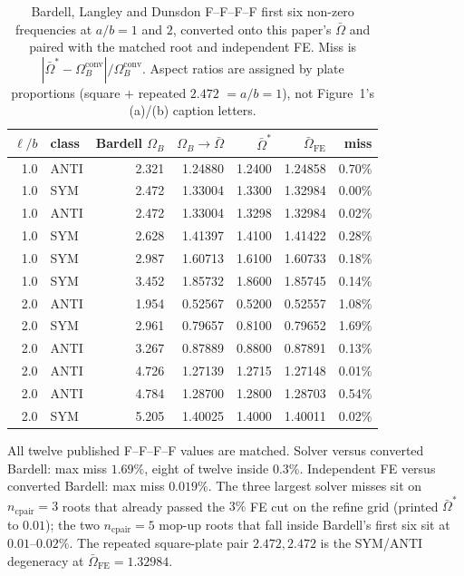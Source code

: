 \documentclass[11pt]{article}
\begin{document}
\begin{table}[!htbp]\centering\footnotesize
\caption{Bardell, Langley and Dunsdon \cite{bardell1996} F--F--F--F first
six non-zero frequencies at $a/b=1$ and $2$, converted onto this paper's
$\bar\Omega$ and paired with the matched root and independent FE.
Miss is $|\bar\Omega^{*}-\Omega_B^{\mathrm{conv}}|/\Omega_B^{\mathrm{conv}}$.
Aspect ratios are assigned by plate proportions (square $+$ repeated
$2.472$ $=a/b=1$), not Figure~1's (a)/(b) caption letters.}
\label{tab:bardell}
\setlength{\tabcolsep}{4pt}
\begin{tabular}{@{}rlrrrrr@{}}
\toprule
$\ell/b$ & class & Bardell $\Omega_B$ & $\Omega_B\to\bar\Omega$ & $\bar\Omega^{*}$ & $\bar\Omega_{\mathrm{FE}}$ & miss \\
\midrule
1.0 & ANTI & 2.321 & 1.24880 & 1.2400 & 1.24858 & 0.70\% \\
1.0 & SYM  & 2.472 & 1.33004 & 1.3300 & 1.32984 & 0.00\% \\
1.0 & ANTI & 2.472 & 1.33004 & 1.3298 & 1.32984 & 0.02\% \\
1.0 & SYM  & 2.628 & 1.41397 & 1.4100 & 1.41422 & 0.28\% \\
1.0 & SYM  & 2.987 & 1.60713 & 1.6100 & 1.60733 & 0.18\% \\
1.0 & SYM  & 3.452 & 1.85732 & 1.8600 & 1.85745 & 0.14\% \\
2.0 & ANTI & 1.954 & 0.52567 & 0.5200 & 0.52557 & 1.08\% \\
2.0 & SYM  & 2.961 & 0.79657 & 0.8100 & 0.79652 & 1.69\% \\
2.0 & ANTI & 3.267 & 0.87889 & 0.8800 & 0.87891 & 0.13\% \\
2.0 & ANTI & 4.726 & 1.27139 & 1.2715 & 1.27148 & 0.01\% \\
2.0 & ANTI & 4.784 & 1.28700 & 1.2800 & 1.28703 & 0.54\% \\
2.0 & SYM  & 5.205 & 1.40025 & 1.4000 & 1.40011 & 0.02\% \\
\bottomrule
\end{tabular}
\end{table}

All twelve published F--F--F--F values are matched. Solver versus
converted Bardell: max miss $1.69\%$, eight of twelve inside $0.3\%$.
Independent FE versus converted Bardell: max miss $0.019\%$. The three
largest solver misses sit on $n_{\mathrm{cpair}}=3$ roots that already
passed the $3\%$ FE cut on the refine grid (printed $\bar\Omega^{*}$ to
$0.01$); the two $n_{\mathrm{cpair}}=5$ mop-up roots that fall inside
Bardell's first six sit at $0.01$--$0.02\%$. The repeated square-plate
pair $2.472,2.472$ is the SYM/ANTI degeneracy at
$\bar\Omega_{\mathrm{FE}}=1.32984$.
\end{document}
